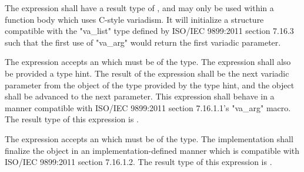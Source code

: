
\specsubsubitem
The  expression shall have a result type of
, and may only be used within a function body which uses
C-style variadism. It will initialize a structure compatible with the
"va\_list" type defined by ISO/IEC 9899:2011 section 7.16.3 such that the first
use of "va\_arg" would return the first variadic parameter.

\specsubsubitem
The  expression accepts an  which
must be of the  type. The expression shall also be provided a
type hint. The result of the expression shall be the next variadic parameter
from the  object of the type provided by the type hint, and
the object shall be advanced to the next parameter. This expression shall
behave in a manner compatible with ISO/IEC 9899:2011 section 7.16.1.1's
"va\_arg" macro. The result type of this expression is .

\specsubsubitem
The  expression accepts an  which
must be of the  type. The implementation shall finalize the
 object in an implementation-defined manner which is
compatible with ISO/IEC 9899:2011 section 7.16.1.2. The result type of this
expression is .


\begin{grammar}
 \\
	 \\
	 \\
	 \\
	 \\
	 \\
	 \\
\end{grammar}


\begin{grammar}
 \\
	 \\
	 \\
	 \\
	 \\
	  \\

 \oneof \\
	\terminal{+}
	\terminal{-}
	\terminal{\textasciitilde}
	\terminal{!}
	\terminal{*}
	\terminal{\&}
\end{grammar}


